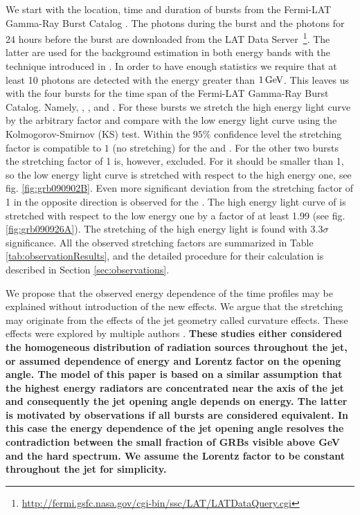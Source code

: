 \documentclass[manuscript]{aastex}
\begin{document}
We start with the location, time and duration of bursts from the
Fermi-LAT Gamma-Ray Burst Catalog \citep{Ackermann:2013zfa}. The
photons during the burst and the photons for 24 hours before the burst
are downloaded from the LAT Data
Server~\footnote{\url{http://fermi.gsfc.nasa.gov/cgi-bin/ssc/LAT/LATDataQuery.cgi}}.
The latter are used for the background estimation in both energy bands
with the technique introduced in \citet{Rubtsov:2011qq}. In order to
have enough statistics we require that at least 10 photons are
detected with the energy greater than $\unit[1]{GeV}$. This leaves us
with the four bursts for the time span of the Fermi-LAT Gamma-Ray
Burst Catalog. Namely,  \citep{Tajima:2009az}, 
\citep{Ackermann:2010us},  \citep{Abdo:2009pg} and
 \citep{Bregeon:2011bu}. For these bursts we stretch the
high energy light curve by the arbitrary factor and compare with the
low energy light curve using the Kolmogorov-Smirnov (KS) test. Within
the $95\%$ confidence level the stretching factor is compatible to $1$
(no stretching) for the  and . For the other two
bursts the stretching factor of 1 is, however, excluded.  For 
it should be smaller than 1, so the low energy light curve is
stretched with respect to the high energy one, see
fig. \ref{fig:grb090902B}.  Even more significant deviation from the
stretching factor of 1 in the opposite direction is observed for the
. The high energy light curve of  is stretched
with respect to the low energy one by a factor of at least 1.99 (see
fig. \ref{fig:grb090926A}).  The stretching of the  high
energy light is found with $3.3\sigma$ significance.  All the observed
stretching factors are summarized in Table
\ref{tab:observationResults}, and the detailed procedure for their
calculation is described in Section \ref{sec:observations}.

We propose that the observed energy dependence of the time profiles
may be explained without introduction of the new effects. We argue
that the stretching may originate from the effects of the jet geometry
called curvature effects. These effects were explored by multiple
authors {\bf \citep{Meszaros:1997je,Soderberg:2001mk,Nakamura:2001kd,Shen:2005ea,Shenoy:2013cba,granot2002off}}. {\bf These
studies either considered the homogeneous
distribution of radiation sources throughout the jet, or assumed
dependence of energy and Lorentz factor on the opening angle. The model of this paper is
based on a similar assumption that the highest energy radiators are
concentrated near the axis of the jet and consequently the jet opening
angle depends on energy. The latter is motivated by observations if
all bursts are considered equivalent. In this case the energy
dependence of the jet opening angle resolves the contradiction between
the small fraction of GRBs visible above GeV and the hard
spectrum. We assume the Lorentz factor to be constant throughout the jet for simplicity.}
\end{document}
